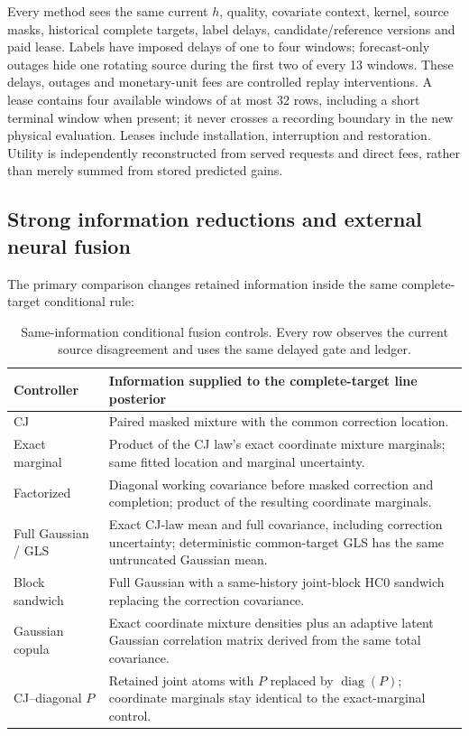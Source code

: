 \documentclass[10pt]{article}
\DeclareMathOperator{\diag}{diag}
\begin{document}
Every method sees the same current $h$, quality, covariate context, kernel,
source masks, historical complete targets, label delays, candidate/reference
versions and paid lease. Labels have imposed delays of one to four windows;
forecast-only outages hide one rotating source during the first two of every
13 windows. These delays, outages and monetary-unit fees are controlled
replay interventions. A lease contains four available windows of at most
32 rows, including a short terminal window when present; it never crosses
a recording boundary in the new physical evaluation. Leases include
installation, interruption and restoration. Utility is independently
reconstructed from served requests and direct fees, rather than merely
summed from stored predicted gains.

\subsection{Strong information reductions and external neural fusion}
The primary comparison changes retained information inside the same
complete-target conditional rule:

\begin{table}[t]
\centering\small
\caption{Same-information conditional fusion controls. Every row observes
the current source disagreement and uses the same delayed gate and ledger.}
\label{tab:conditional-controls}
\begin{tabular}{p{.24\linewidth}p{.68\linewidth}}
\toprule
Controller & Information supplied to the complete-target line posterior\\
\midrule
CJ & Paired masked mixture with the common correction location.\\
Exact marginal & Product of the CJ law's exact coordinate mixture
marginals; same fitted location and marginal uncertainty.\\
Factorized & Diagonal working covariance before masked correction and
completion; product of the resulting coordinate marginals.\\
Full Gaussian / GLS & Exact CJ-law mean and full covariance, including
correction uncertainty; deterministic common-target GLS has the same
untruncated Gaussian mean.\\
Block sandwich & Full Gaussian with a same-history joint-block HC0
sandwich replacing the correction covariance.\\
Gaussian copula & Exact coordinate mixture densities plus an adaptive
latent Gaussian correlation matrix derived from the same total covariance.\\
CJ--diagonal $P$ & Retained joint atoms with $P$ replaced by $\diag(P)$;
coordinate marginals stay identical to the exact-marginal control.\\
\bottomrule
\end{tabular}
\end{table}
\end{document}
